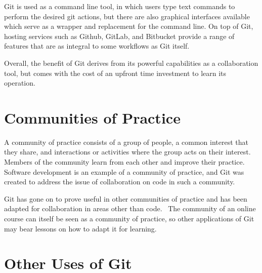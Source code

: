 \documentclass[12pt,twoside,vi]{mitthesis}
\newcommand{\draft}[1]{{\color{blue} #1}}
\begin{document}
Git is used as a command line tool, in which users type text commands to perform the desired git actions, but there are also graphical interfaces available which serve as a wrapper and replacement for the command line. On top of Git, hosting services such as Github, GitLab, and Bitbucket provide a range of features that are as integral to some workflows as Git itself.~\cite{githosting}

Overall, the benefit of Git derives from its powerful capabilities as a collaboration tool, but comes with the cost of an upfront time investment to learn its operation.

\section{Communities of Practice}

A community of practice consists of a group of people, a common interest that they share, and interactions or activities where the group acts on their interest. Members of the community learn from each other and improve their practice. Software development is an example of a community of practice, and Git was created to address the issue of collaboration on code in such a community.~\cite{teachingdigital}

\draft{Git has gone on to prove useful in other communities of practice and has been adapted for collaboration in areas other than code.~\cite{sevenwaysgit} The community of an online course can itself be seen as a community of practice, so other applications of Git may bear lessons on how to adapt it for learning.}

\section{Other Uses of Git}
\end{document}
